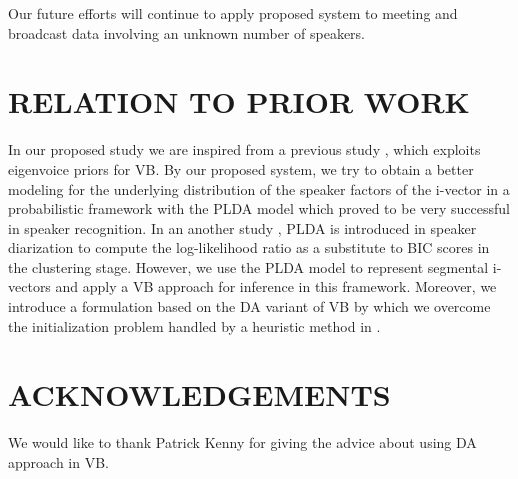 \documentclass{article}
\begin{document}
Our future efforts will continue to apply proposed system to meeting and broadcast data involving an unknown number of speakers.

\section{RELATION TO PRIOR WORK}
\label{sec:prior}

In our proposed study we are inspired from a previous study \cite{kenny2010diarFA}, which exploits eigenvoice priors for VB. By our proposed system, we try to obtain a better modeling for the underlying distribution of the speaker factors of the i-vector in a probabilistic framework with the PLDA model which proved to be very successful in speaker recognition. In an another study \cite{prazak2011clusterPLDA}, PLDA is introduced in speaker diarization to compute the log-likelihood ratio as a substitute to BIC scores in the clustering stage. However, we use the PLDA model to represent segmental i-vectors and apply a VB approach for inference in this framework. Moreover, we introduce a formulation based on the DA variant of VB by which we overcome the initialization problem handled by a heuristic method in \cite{kenny2010diarFA}. 

\section{ACKNOWLEDGEMENTS}
\label{sec:acknow}
We would like to thank Patrick Kenny for giving the advice about using DA approach in VB. 



\end{document}
